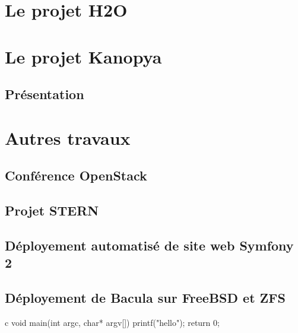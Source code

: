 \chapter{Le projet H2O}



\chapter{Le projet Kanopya}

\section{Présentation}


\chapter{Autres travaux}

\section{Conférence OpenStack}

\section{Projet STERN}


\section{Déployement automatisé de site web Symfony 2}


\section{Déployement de Bacula sur FreeBSD et ZFS}


\begin{pygmented}{c}
void main(int argc, char* argv[])
{
	printf("hello");
	return 0;
}
\end{pygmented}

\cite{test}
